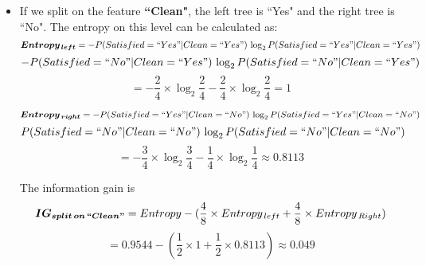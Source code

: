 \documentclass{article}
\begin{document}
\begin{itemize}
    \item If we split on the feature \textbf{``Clean"}, the left tree is ``Yes" and the right tree is ``No". The entropy on this level can be calculated as:
    \[\boldsymbol{Entropy_{\,left}} = - P(Satisfied=``Yes"|Clean=``Yes")\,\log_{2}P(Satisfied=``Yes"|Clean=``Yes") \]\[ -P(Satisfied=``No"|Clean=``Yes")\,\log_{2}P(Satisfied=``No"|Clean=``Yes")\]
    \[= -\frac{2}{4}\times \log_{2}\frac{2}{4} - \frac{2}{4}\times \log_{2}\frac{2}{4} = 1\]
    
    \[\boldsymbol{Entropy_{\,right}} = -P(Satisfied=``Yes"|Clean=``No")\,\log_{2}P(Satisfied=``Yes"|Clean=``No") \]\[ P(Satisfied=``No"|Clean=``No")\,\log_{2}P(Satisfied=``No"|Clean=``No")\]
    \[
    = -\frac{3}{4}\times \log_{2}\frac{3}{4} - \frac{1}{4}\times \log_{2}\frac{1}{4}\approx 0.8113
    \]
    
    The information gain is
    \[ \boldsymbol{IG_{split\,on\,``Clean"}} = Entropy - (\frac{4}{8}\times Entropy_{\,left}+\frac{4}{8}\times Entropy_{\,Right}) \]\[= 0.9544 - (\frac{1}{2}\times1+\frac{1}{2}\times0.8113) \approx 0.049\]
    

\end{itemize}
\end{document}
